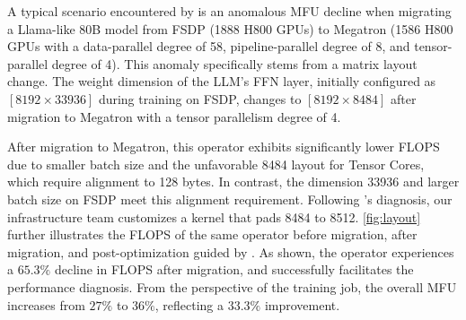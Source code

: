 


A typical scenario encountered by \sysname{} is an anomalous MFU decline when migrating a Llama-like 80B model from FSDP (1888 H800 GPUs) to Megatron (1586 H800 GPUs with a data-parallel degree of 58, pipeline-parallel degree of 8, and tensor-parallel degree of 4). This anomaly specifically stems from a matrix layout change. The weight dimension of the LLM’s FFN layer, initially configured as $[8192 \times 33936]$ during training on FSDP, changes to $[8192 \times 8484]$ after migration to Megatron with a tensor parallelism degree of 4.

After migration to Megatron, this operator exhibits significantly lower FLOPS due to smaller batch size and the unfavorable 8484 layout for Tensor Cores, which require alignment to 128 bytes. In contrast, the dimension 33936 and larger batch size on FSDP meet this alignment requirement. Following \sysname{}’s diagnosis, our infrastructure team customizes a kernel that pads 8484 to 8512. \autoref{fig:layout} further illustrates the FLOPS of the same operator before migration, after migration, and post-optimization guided by \sysname{}. As shown, the operator experiences a $65.3\%$ decline in FLOPS after migration, and \sysname{} successfully facilitates the performance diagnosis. From the perspective of the training job, the overall MFU increases from $27\%$ to $36\%$, reflecting a $33.3\%$ improvement.

